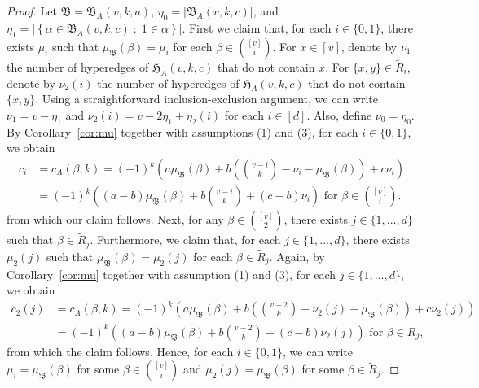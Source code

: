 \documentclass[10pt,a4paper]{amsart}
\begin{document}
\begin{proof}
Let $\mathfrak B = \mathfrak B_A(v,k,a)$, $\eta_{0} = |\mathfrak B_A(v,k,c)|$, and $\eta_1 = \left |\left \{ \alpha \in \mathfrak B_A(v,k,c) \; : \; 1 \in \alpha \right \} \right |$.
First we claim that, for each $i\in\{0,1\}$, there exists $\mu_i$ such that $\mu_\mathfrak B(\beta) = \mu_i$ for each $\beta \in \binom{[v]}{i}$. 
For $x \in [v]$, denote by $\nu_1$ the number of hyperedges of $\mathfrak H_{A}(v,k,c)$ that do not contain $x$.
For $\{x,y\}\in \tilde{R}_i$, denote by $\nu_2(i)$ the number of hyperedges of $\mathfrak H_{A}(v,k,c)$ that do not contain $\{x,y\}$.
Using a straightforward inclusion-exclusion argument, we can write $\nu_1 = v - \eta_1$ and $\nu_2(i) = v - 2\eta_1+\eta_2(i)$ for each $i \in [d]$.
Also, define $\nu_0 = \eta_0$.
By Corollary~\ref{cor:mu}
together with assumptions (1) and (3), for each $i\in\{0,1\}$, we obtain
\begin{align*}
    c_i &= c_A(\beta,k)=(-1)^{k}\left(a\mu_\mathfrak B(\beta)+b\left(\binom{v-i}{k}-\nu_i-\mu_\mathfrak B(\beta)\right)+c\nu_i\right)\nonumber\\
    &= (-1)^{k}\left((a-b)\mu_\mathfrak B(\beta)+b\binom{v-i}{k}+(c-b)\nu_i\right)\text{ for }\beta\in\binom{[v]}{i}.
\end{align*}
from which our claim follows.
Next, for any $\beta \in \binom{[v]}{2}$, there exists $j \in \{1,\dots,d\}$ such that $\beta \in \tilde{R}_j$.
Furthermore, we claim that, for each $j \in \{1,\dots,d\}$, there exists $\mu_2(j)$ such that $\mu_\mathfrak B(\beta) =\mu_2(j)$ for each $\beta \in \tilde{R}_j$.
Again, by Corollary~\ref{cor:mu}
together with assumption (1) and (3), for each $j \in \{1,\dots,d\}$, we obtain
\begin{align*}
    c_2(j) &=  c_A(\beta,k)=(-1)^{k}\left(a\mu_\mathfrak B(\beta)+b\left(\binom{v-2}{k}-\nu_2(j)-\mu_\mathfrak B(\beta)\right)+c\nu_2(j)\right)\nonumber    \\
    &= (-1)^{k}\left((a-b)\mu_\mathfrak B(\beta)+b\binom{v-2}{k}+(c-b)\nu_2(j)\right)\text{ for }\beta\in\tilde{R}_j,
\end{align*}
from which the claim follows.
Hence, for each $i\in\{0,1\}$, we can write $\mu_i=\mu_\mathfrak B(\beta)$ for some $\beta \in \binom{[v]}{i}$ and $\mu_{2}(j)=\mu_\mathfrak B(\beta)$ for some $\beta \in \tilde{R}_j$.


\end{proof}
\end{document}
